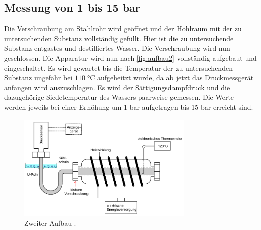 \subsection{Messung von 1 bis 15 bar}
Die Verschraubung am Stahlrohr wird geöffnet und der Hohlraum mit der zu untersuchenden Substanz vollständig gefüllt.
Hier ist die zu untersuchende Substanz entgastes und destilliertes Wasser. Die Verschraubung wird nun geschlossen.
Die Apparatur wird nun nach \autoref{fig:aufbau2} vollständig aufgebaut und eingeschaltet. Es wird gewartet bis die Temperatur der zu 
untersuchenden Substanz ungefähr bei $\SI{110}{\celsius}$ aufgeheitzt wurde, da ab jetzt das Druckmessgerät anfangen wird auszuschlagen. 
Es wird der Sättigungsdampfdruck und die dazugehörige Siedetemperatur des Wassers paarweise gemessen.
Die Werte werden jeweils bei einer Erhöhung um 1 bar aufgetragen bis 15 bar erreicht sind.


\begin{figure}[H]
    \centering
    \includegraphics[width=0.75\textwidth]{daten/aufbau2.png}
    \caption{Zweiter Aufbau \cite{anleitung}.}
    \label{fig:aufbau2}
\end{figure}